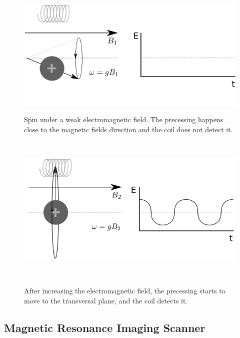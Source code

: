 \begin{figure}[h!]

\begin{minipage}[b]{0.49\textwidth}
    \includegraphics[width=\textwidth]{3.mri/img/spin0.png}
    \caption{Spin under a weak electromagnetic field. The precessing happens close to the magnetic fields direction and the coil does not detect it.}
    \label{fig:nosignal}
\end{minipage} ~ %
\hfill
\begin{minipage}[b]{0.49\textwidth}
    \includegraphics[width=\textwidth]{3.mri/img/spin1.png}
    \caption{After increasing the electromagnetic field, the precessing starts to move to the transversal plane, and the coil detects it.}
    \label{fig:signal}    
\end{minipage} ~ %

\end{figure}

\subsection{Magnetic Resonance Imaging Scanner}


